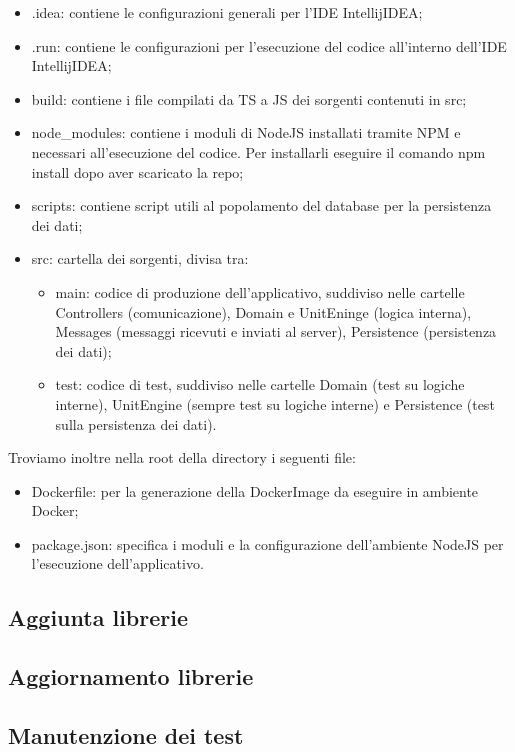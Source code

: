 	\begin{itemize}
		\item{.idea}: contiene le configurazioni generali per l'IDE IntellijIDEA;
		\item{.run}: contiene le configurazioni per l'esecuzione del codice all'interno dell'IDE IntellijIDEA;
		\item{build}: contiene i file compilati da TS a JS dei sorgenti contenuti in src;
		\item{node\_modules}: contiene i moduli di NodeJS installati tramite NPM e	necessari all'esecuzione del codice. Per installarli eseguire il comando npm install dopo aver scaricato la repo;
		\item{scripts}: contiene script utili al popolamento del database per la persistenza dei dati;
		\item{src}: cartella dei sorgenti, divisa tra:
		\begin{itemize}
			\item{main}: codice di produzione dell'applicativo, suddiviso nelle cartelle Controllers (comunicazione), Domain e UnitEninge (logica interna), Messages (messaggi ricevuti e inviati al server), Persistence (persistenza dei dati);
			\item{test}: codice di test, suddiviso nelle cartelle Domain (test su logiche interne),	UnitEngine (sempre test su logiche interne) e Persistence (test sulla persistenza dei dati).
		\end{itemize}
	\end{itemize}
	
	Troviamo inoltre nella root della directory i seguenti file:
	\begin{itemize}
		\item{Dockerfile}: per la generazione della DockerImage da eseguire in ambiente Docker;
		\item{package.json}: specifica i moduli e la configurazione dell'ambiente NodeJS per l'esecuzione dell'applicativo.
	\end{itemize}

\newpage
	
\subsection{Aggiunta librerie}

\subsection{Aggiornamento librerie}

\subsection{Manutenzione dei test}
